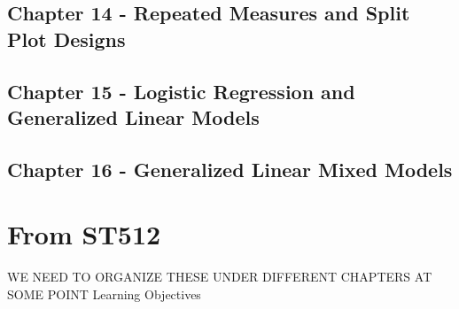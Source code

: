 \documentclass[]{book}
\begin{document}
\subsection{Chapter 14 - Repeated Measures and Split Plot
Designs}\label{chapter-14---repeated-measures-and-split-plot-designs}

\subsection{Chapter 15 - Logistic Regression and Generalized Linear
Models}\label{chapter-15---logistic-regression-and-generalized-linear-models}

\subsection{Chapter 16 - Generalized Linear Mixed
Models}\label{chapter-16---generalized-linear-mixed-models}

\section{From ST512}\label{from-st512}

WE NEED TO ORGANIZE THESE UNDER DIFFERENT CHAPTERS AT SOME POINT
Learning Objectives
\end{document}
